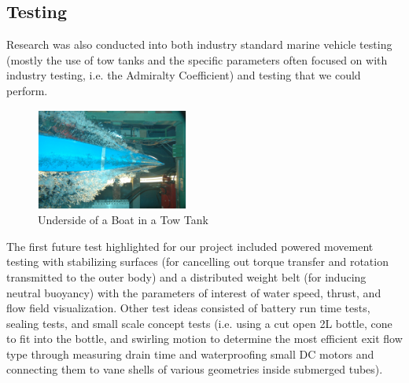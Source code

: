 \documentclass{report}
\begin{document}
\subsection{Testing}
Research was also conducted into both industry standard marine vehicle testing (mostly the use of tow tanks and the specific parameters often focused on with industry testing, i.e. the Admiralty Coefficient) and testing that we could perform. \par
\begin{figure}[h]
\centering
\includegraphics[width=5cm]{"Test Tank"}
\caption{Underside of a Boat in a Tow Tank}
\end{figure}
The first future test highlighted for our project included powered movement testing with stabilizing surfaces (for cancelling out torque transfer and rotation transmitted to the outer body) and a distributed weight belt (for inducing neutral buoyancy) with the parameters of interest of water speed, thrust, and flow field visualization.  Other test ideas consisted of battery run time tests, sealing tests, and small scale concept tests (i.e. using a cut open 2L bottle, cone to fit into the bottle, and swirling motion to determine the most efficient exit flow type through measuring drain time and waterproofing small DC motors and connecting them to vane shells of various geometries inside submerged tubes).
\end{document}
